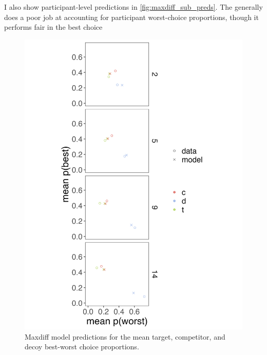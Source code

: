 I also show participant-level predictions in \ref{fig:maxdiff_sub_preds}. The generally does a poor job at accounting for participant worst-choice proportions, though it performs fair in the best choice 
\begin{figure}
   \includegraphics[width=\linewidth]{figures/maxdiff_2_means_model_v_data.jpeg}
   \caption{Maxdiff model predictions for the mean target, competitor, and decoy best-worst choice proportions.}
   \label{fig:maxdiff_collapsed_preds}
\end{figure}

